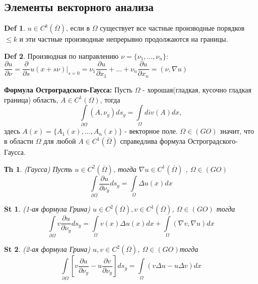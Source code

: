 \documentclass[14pt]{article}
\theoremstyle{plain}
\newtheorem{Thm}{Тh}
\newtheorem{St}{St}
\theoremstyle{definition}
\newtheorem{Def}{Def}
\begin{document}
		\subsection{Элементы векторного анализа}
			\begin{Def}
				$u \in C^k(\overline{\Omega})$, если в $\Omega$ существует все частные производные порядков $ \leq k$ и эти частные производные непрерывно продолжаются на границы.
			\end{Def}
			\begin{Def}
				Производная по направлению $\nu = \{\nu_1, \dots , \nu_n\}$:  $\dfrac{\partial u}{\partial \nu} = \dfrac{\partial}{\partial s} u(x + s \nu)|_{s=0} = \nu_1 \dfrac{\partial u}{\partial x_1} + \dots + \nu_n \dfrac{\partial u}{\partial x_n} = (\nu, \nabla u)$
			\end{Def}
			\textbf{Формула Остроградского-Гаусса:}
			Пусть $\Omega$ - хорошая(гладкая, кусочно гладкая граница) область, $A \in C^1(\Omega)$, тогда
			$$
				\int\limits_{\partial \Omega} (A, \nu_y) d s_y = \int\limits_{\Omega} div(A) dx,
			$$
			здесь $A(x) = \{A_1(x), \dots, A_n(x)\}$ - векторное поле.\newline
			$\Omega \in (GO)$ значит, что в области $\Omega$ для любой $A \in C^1(\overline{\Omega})$ справедлива формула Остроградского-Гаусса. 
			\begin{Thm}
				(Гаусса) \newline
				Пусть $u \in C^2(\overline{\Omega})$, тогда $\nabla u \in C^1(\overline{\Omega})$ , $\Omega \in (GO)$
				$$
					\int\limits_{\partial \Omega} \dfrac{\partial u}{\partial \nu_y} d s_y = \int\limits_{\Omega} \Delta u(x) dx
				$$
			\end{Thm}
			\begin{St}
				(1-ая формула Грина)\newline
				$u \in C^2(\overline{\Omega}), v \in C^1(\overline{\Omega})$, $\Omega \in (GO)$ тогда
				$$\int\limits_{\partial \Omega} v \dfrac{\partial u}{\partial \nu_y} ds_y = \int\limits_{\Omega} v(x) \Delta u(x) dx + \int\limits_{\Omega} (\nabla v, \nabla u) dx$$
			\end{St}
		\begin{St}
			(2-ая формула Грина)\newline
			$u, v \in C^2(\overline{\Omega})$, $\Omega \in (GO)$тогда
			$$\int\limits_{\partial \Omega} \left[v \dfrac{\partial u}{\partial \nu_y} - u \dfrac{\partial v}{\partial \nu_y}\right]  ds_y = \int\limits_{\Omega} (v \Delta u - u \Delta v) dx$$
		\end{St}
\end{document}
